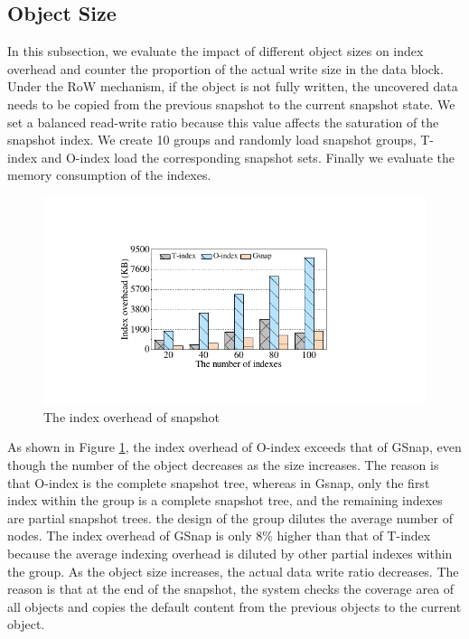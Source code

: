 \documentclass[sigconf, nonacm]{acmart}
\begin{document}
\subsection{Object Size}
In this subsection, we evaluate the impact of different object sizes on index overhead and counter the proportion of the actual write size in the data block. 
Under the RoW mechanism, if the object is not fully written, the uncovered data needs to be copied from the previous snapshot to the current snapshot state. We set a balanced read-write ratio because this value affects the saturation of the snapshot index. 
We create 10 groups and randomly load snapshot groups, T-index and O-index load the corresponding snapshot sets. Finally we evaluate the memory consumption of the indexes.

\begin{figure}[htbp]
	\centering
	\includegraphics[width=0.8\columnwidth]{figures/ceph_pic/eval_indexmemory.pdf}
	\caption{The index overhead of snapshot}
	\label{fig:objectsize}
\end{figure}
\vspace{-0.3cm}

As shown in Figure \ref{fig:objectsize}, the index overhead of O-index exceeds that of GSnap, even though the number of the object decreases as the size increases. The reason is that O-index is the complete snapshot tree, whereas in Gsnap, only the first index within the group is a complete snapshot tree, and the remaining indexes are partial snapshot trees. the design of the group dilutes the average number of nodes. The index overhead of GSnap is only 8\% higher than that of T-index because the average indexing overhead is diluted by other partial indexes within the group.
As the object size increases, the actual data write ratio decreases. The reason is that at the end of the snapshot, the system checks the coverage area of all objects and copies the default content from the previous objects to the current object.
\end{document}
